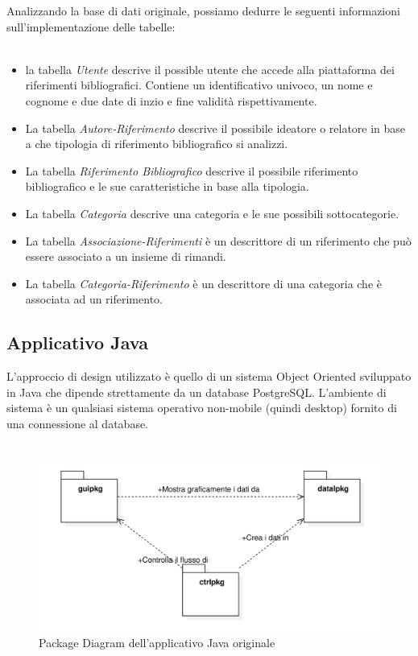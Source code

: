 Analizzando la base di dati originale, possiamo dedurre le seguenti informazioni sull'implementazione delle tabelle:
\\~\\
\begin{itemize}
    \item la tabella \textit{Utente} descrive il possible utente che accede alla piattaforma dei riferimenti bibliografici. Contiene un identificativo univoco, un nome e cognome e due date di inzio e fine validità rispettivamente. \\
    \item La tabella \textit{Autore-Riferimento} descrive il possibile ideatore o relatore in base a che tipologia di riferimento bibliografico si analizzi. \\
    \item La tabella \textit{Riferimento Bibliografico} descrive il possibile riferimento bibliografico e le sue caratteristiche in base alla tipologia. \\
    \item La tabella \textit{Categoria} descrive una categoria e le sue possibili sottocategorie. \\
    \item La tabella \textit{Associazione-Riferimenti} è un descrittore di un riferimento che può essere associato a un insieme di rimandi. \\
    \item La tabella \textit{Categoria-Riferimento} è un descrittore di una categoria che è associata ad  un riferimento. \\

\end{itemize}
\newpage
\raggedright{\subsection{Applicativo Java}}
L’approccio di design utilizzato è quello di un sistema Object Oriented sviluppato in Java che dipende strettamente da un database PostgreSQL. L’ambiente di sistema è un qualsiasi sistema operativo non-mobile (quindi desktop) fornito di una connessione al database.
\\~\\
\begin{figure}[H]
    \centering
        \includegraphics[width=.90\textwidth]{Immagini/VecchioProgetto/UML OO Java vecchioProgetto.png} 
    \caption{Package Diagram dell'applicativo Java originale}
\end{figure}

